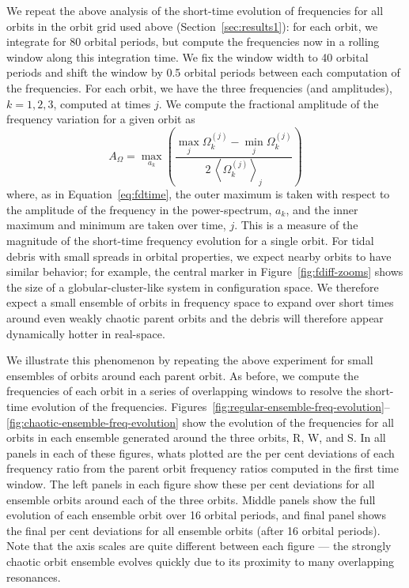 \documentclass[letterpaper,12pt,preprint]{aastex}
\newcommand{\mean}[1]{\left< #1 \right>}
\begin{document}
We repeat the above analysis of the short-time evolution of frequencies for all orbits in the orbit grid used above (Section~\ref{sec:results1}): for each orbit, we integrate for 80 orbital periods, but compute the frequencies now in a rolling window along this integration time. We fix the window width to 40 orbital periods and shift the window by 0.5 orbital periods between each computation of the frequencies. For each orbit, we have the three frequencies (and amplitudes), $k=1,2,3$, computed at times $j$. We compute the fractional amplitude of the frequency variation for a given orbit as
\begin{equation}
	A_\Omega = \max_{a_k} \left(\frac{\max_j \Omega^{(j)}_{k} - \min_j \Omega^{(j)}_{k}}{2 \, \mean{\Omega^{(j)}_{k}}_j}\right) \label{eq:frac-freq-amp}
\end{equation}
where, as in Equation~\ref{eq:fdtime}, the outer maximum is taken with respect to the amplitude of the frequency in the power-spectrum, $a_k$, and the inner maximum and minimum are taken over time, $j$. This is a measure of the magnitude of the short-time frequency evolution for a single orbit. For tidal debris with small spreads in orbital properties, we expect nearby orbits to have similar behavior; for example, the central marker in Figure~\ref{fig:fdiff-zooms} shows the size of a globular-cluster-like system in configuration space. We therefore expect a small ensemble of orbits in frequency space to expand over short times around even weakly chaotic parent orbits and the debris will therefore appear dynamically hotter in real-space. 

We illustrate this phenomenon by repeating the above experiment for small ensembles of orbits around each parent orbit. As before, we compute the frequencies of each orbit in a series of overlapping windows to resolve the short-time evolution of the frequencies. Figures~\ref{fig:regular-ensemble-freq-evolution}--\ref{fig:chaotic-ensemble-freq-evolution} show the evolution of the frequencies for all orbits in each ensemble generated around the three orbits, R, W, and S. In all panels in each of these figures, whats plotted are the per cent deviations of each frequency ratio from the parent orbit frequency ratios computed in the first time window. The left panels in each figure show these per cent deviations for all ensemble orbits around each of the three orbits. Middle panels show the full evolution of each ensemble orbit over 16 orbital periods, and final panel shows the final per cent deviations for all ensemble orbits (after 16 orbital periods). Note that the axis scales are quite different between each figure --- the strongly chaotic orbit ensemble evolves quickly due to its proximity to many overlapping resonances. 
\end{document}
